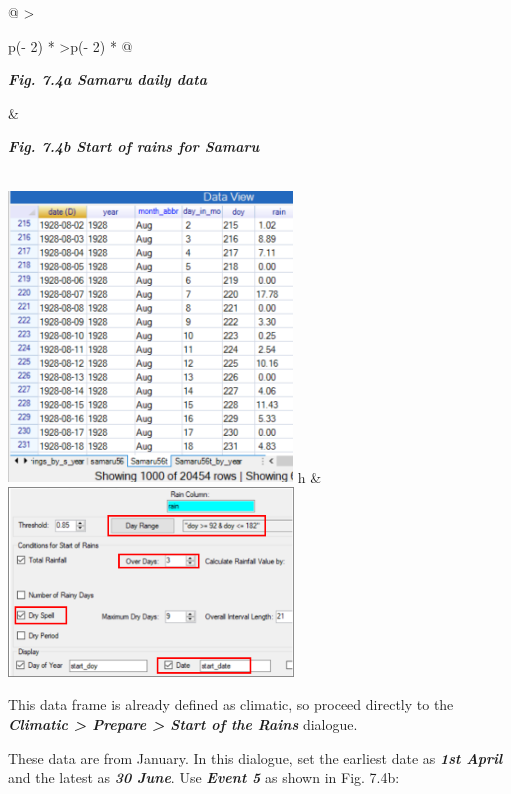 \documentclass[
  letterpaper,
  DIV=11,
  numbers=noendperiod]{scrreprt}
\begin{document}
\begin{longtable}[]{@{}
  >{\raggedright\arraybackslash}p{(\columnwidth - 2\tabcolsep) * }
  >{\raggedleft\arraybackslash}p{(\columnwidth - 2\tabcolsep) * }@{}}
\toprule\noalign{}
\begin{minipage}[b]{\linewidth}\raggedright
\textbf{\emph{Fig. 7.4a Samaru daily data}}
\end{minipage} & \begin{minipage}[b]{\linewidth}\raggedleft
\textbf{\emph{Fig. 7.4b Start of rains for Samaru}}
\end{minipage} \\
\midrule\noalign{}
\endhead
\bottomrule\noalign{}
\endlastfoot
\includegraphics[width=2.96934in,height=3.03661in]{figures/Fig7.4a.png}
h &
\includegraphics[width=2.98372in,height=\textheight]{figures/Fig7.4b.png} \\
\end{longtable}

This data frame is already defined as climatic, so proceed directly to
the \textbf{\emph{Climatic \textgreater{} Prepare \textgreater{} Start
of the Rains}} dialogue.

These data are from January. In this dialogue, set the earliest date as
\textbf{\emph{1st April}} and the latest as \textbf{\emph{30 June}}. Use
\textbf{\emph{Event 5}} as shown in Fig. 7.4b:
\end{document}

